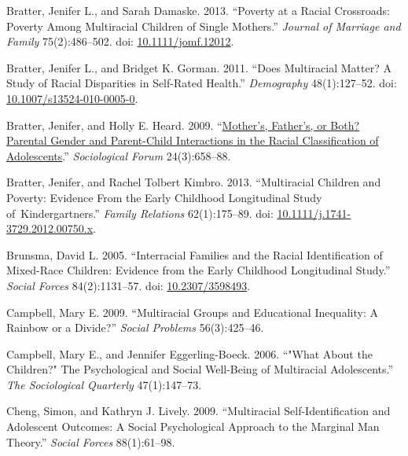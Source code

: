 \documentclass[
  letterpaper,
  DIV=11,
  numbers=noendperiod]{scrartcl}
\newlength{\cslhangindent}
\newlength{\cslentryspacingunit} %
\newenvironment{CSLReferences}[2] %
 {%
  \setlength{\parindent}{0pt}
  \ifodd #1
  \let\oldpar\par
  \def\par{\hangindent=\cslhangindent\oldpar}
  \fi
  \setlength{\parskip}{#2\cslentryspacingunit}
 }%
 {}
\begin{document}
\begin{CSLReferences}{1}{0}
\leavevmode{}%
Bratter, Jenifer L., and Sarah Damaske. 2013. {``Poverty at a {Racial
Crossroads}: {Poverty Among Multiracial Children} of {Single
Mothers}.''} \emph{Journal of Marriage and Family} 75(2):486--502. doi:
\href{https://doi.org/10.1111/jomf.12012}{10.1111/jomf.12012}.

\leavevmode{}%
Bratter, Jenifer L., and Bridget K. Gorman. 2011. {``Does {Multiracial
Matter}? {A Study} of {Racial Disparities} in {Self-Rated Health}.''}
\emph{Demography} 48(1):127--52. doi:
\href{https://doi.org/10.1007/s13524-010-0005-0}{10.1007/s13524-010-0005-0}.

\leavevmode{}%
Bratter, Jenifer, and Holly E. Heard. 2009.
{``\href{http://www.jstor.org/stable/40542696}{Mother's, {Father}'s, or
{Both}? {Parental Gender} and {Parent-Child Interactions} in the {Racial
Classification} of {Adolescents}}.''} \emph{Sociological Forum}
24(3):658--88.

\leavevmode{}%
Bratter, Jenifer, and Rachel Tolbert Kimbro. 2013. {``Multiracial
{Children} and {Poverty}: {Evidence From} the {Early Childhood
Longitudinal Study} of~{Kindergartners}.''} \emph{Family Relations}
62(1):175--89. doi:
\href{https://doi.org/10.1111/j.1741-3729.2012.00750.x}{10.1111/j.1741-3729.2012.00750.x}.

\leavevmode{}%
Brunsma, David L. 2005. {``Interracial {Families} and the {Racial
Identification} of {Mixed-Race Children}: {Evidence} from the {Early
Childhood Longitudinal Study}.''} \emph{Social Forces} 84(2):1131--57.
doi: \href{https://doi.org/10.2307/3598493}{10.2307/3598493}.

\leavevmode{}%
Campbell, Mary E. 2009. {``Multiracial {Groups} and {Educational
Inequality}: {A Rainbow} or a {Divide}?''} \emph{Social Problems}
56(3):425--46.

\leavevmode{}%
Campbell, Mary E., and Jennifer Eggerling-Boeck. 2006. {``"{What About}
the {Children}?" {The Psychological} and {Social Well-Being} of
{Multiracial Adolescents}.''} \emph{The Sociological Quarterly}
47(1):147--73.

\leavevmode{}%
Cheng, Simon, and Kathryn J. Lively. 2009. {``Multiracial
{Self-Identification} and {Adolescent Outcomes}: {A Social Psychological
Approach} to the {Marginal Man Theory}.''} \emph{Social Forces}
88(1):61--98.


\end{CSLReferences}
\end{document}
